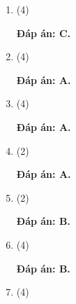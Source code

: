 \begin{enumerate}[label=\bfseries Câu \arabic*:]
\item {}
	
	\cauhoi
	{
		\begin{mcq}(4)

		\end{mcq}
	}
	\loigiai
	{
		
		\textbf{Đáp án: C.}
	}

\item {}
	
	\cauhoi
	{
		\begin{mcq}(4)

		\end{mcq}
	}

	\loigiai
	{		
		\textbf{Đáp án: A.}
	}

\item {}
	
	\cauhoi
	{
		\begin{mcq}(4)

		\end{mcq}
	}

	\loigiai
	{

		
		\textbf{Đáp án: A.}
	}

\item {}
	
	\cauhoi
	{
		\begin{mcq}(2)

		\end{mcq}
	}

	\loigiai
	{
		
		\textbf{Đáp án: A.}
	}

\item {}
	
	\cauhoi
	{
		\begin{mcq}(2)

		\end{mcq}
	}

	\loigiai
	{
		
		\textbf{Đáp án: B.}
	}

\item {}
	
	\cauhoi
	{
		\begin{mcq}(4)

		\end{mcq}
	}

	\loigiai
	{
		
		\textbf{Đáp án: B.}	
	}

\item {}
	
	\cauhoi
	{
		\begin{mcq}(4)


\end{mcq}}
\end{enumerate}
